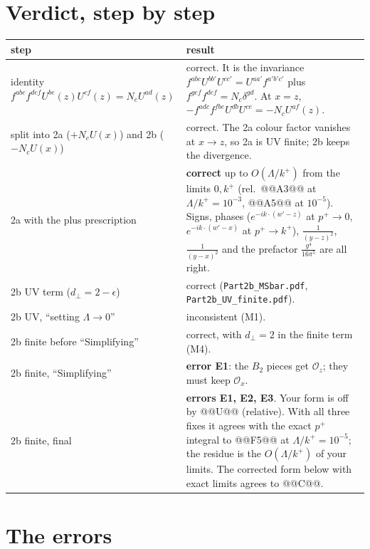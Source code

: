 \documentclass[10pt]{article}
\numberwithin{equation}{section}
\newcommand{\Ox}{\mathcal O_x}
\newcommand{\Oz}{\mathcal O_z}
\begin{document}
\section{Verdict, step by step}
\begin{center}\small
\begin{longtable}{@{}p{}p{}@{}}\toprule
step & result\\\midrule
identity $f^{abc}f^{def}U^{be}(z)U^{cf}(z)=N_cU^{ad}(z)$ & correct. It is the invariance $f^{abc}U^{bb'}U^{cc'}=U^{aa'}f^{a'b'c'}$ plus $f^{gef}f^{def}=N_c\delta^{gd}$. At $x=z$, $-f^{adc}f^{fbe}U^{db}U^{ce}=-N_cU^{af}(z)$.\\
split into 2a ($+N_cU(x)$) and 2b ($-N_cU(x)$) & correct. The 2a colour factor vanishes at $x\to z$, so 2a is UV finite; 2b keeps the divergence.\\
2a with the plus prescription & \textbf{correct} up to $O(\Lambda/k^+)$ from the limits $0,k^+$ (rel.\ @@A3@@ at $\Lambda/k^+=10^{-3}$, @@A5@@ at $10^{-5}$). Signs, phases ($e^{-ik\cdot(w'-z)}$ at $p^+\to0$, $e^{-ik\cdot(w'-x)}$ at $p^+\to k^+$), $\frac{1}{(y-z)^2}$, $\frac{1}{(y-x)^2}$ and the prefactor $\frac{g^4}{16\pi^5}$ are all right.\\
2b UV term ($d_\perp=2-\epsilon$) & correct (\texttt{Part2b\_MSbar.pdf}, \texttt{Part2b\_UV\_finite.pdf}).\\
2b UV, ``setting $\Lambda\to0$'' & inconsistent (M1).\\
2b finite before ``Simplifying'' & correct, with $d_\perp=2$ in the finite term (M4).\\
2b finite, ``Simplifying'' & \textbf{error E1}: the $B_2$ pieces get $\Oz$; they must keep $\Ox$.\\
2b finite, final & \textbf{errors E1, E2, E3}. Your form is off by @@U@@ (relative). With all three fixes it agrees with the exact $p^+$ integral to @@F5@@ at $\Lambda/k^+=10^{-5}$; the residue is the $O(\Lambda/k^+)$ of your limits. The corrected form below with exact limits agrees to @@C@@.\\\bottomrule
\end{longtable}
\end{center}

\section{The errors}
\end{document}
